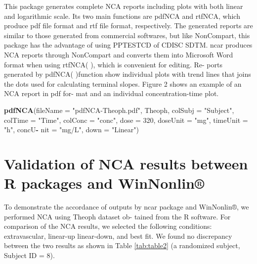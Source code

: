 \documentclass[12pt,]{krantz}
\newenvironment{Shaded}{\begin{snugshade}}{\end{snugshade}}
\newcommand{\KeywordTok}[1]{\textcolor[rgb]{0.13,0.29,0.53}{\textbf{#1}}}
\newcommand{\DataTypeTok}[1]{\textcolor[rgb]{0.13,0.29,0.53}{#1}}
\newcommand{\DecValTok}[1]{\textcolor[rgb]{0.00,0.00,0.81}{#1}}
\newcommand{\StringTok}[1]{\textcolor[rgb]{0.31,0.60,0.02}{#1}}
\newcommand{\OperatorTok}[1]{\textcolor[rgb]{0.81,0.36,0.00}{\textbf{#1}}}
\newcommand{\NormalTok}[1]{#1}
\theoremstyle{definition}
\theoremstyle{definition}
\theoremstyle{definition}
\theoremstyle{remark}
\begin{document}
This package generates complete NCA reports including plots with both
linear and logarithmic scale. Its two main functions are pdfNCA and
rtfNCA, which produce pdf file format and rtf file format, respectively.
The generated reports are similar to those generated from commercial
softwares, but like NonCompart, this package has the advantage of using
PPTESTCD of CDISC SDTM. ncar produces NCA reports through NonCompart and
converts them into Microsoft Word format when using rtfNCA( ), which is
convenient for editing. Re- ports generated by pdfNCA( )function show
individual plots with trend lines that joins the dots used for
calculating terminal slopes. Figure 2 shows an example of an NCA report
in pdf for- mat and an individual concentration-time plot.

\begin{Shaded}
\begin{Highlighting}[]
\KeywordTok{pdfNCA}\NormalTok{(}\DataTypeTok{fileName =} \StringTok{"pdfNCA-Theoph.pdf"}\NormalTok{,}
\NormalTok{Theoph, }\DataTypeTok{colSubj =} \StringTok{"Subject"}\NormalTok{, }\DataTypeTok{colTime =}
\StringTok{"Time"}\NormalTok{, }\DataTypeTok{colConc =} \StringTok{"conc"}\NormalTok{, }\DataTypeTok{dose =} \DecValTok{320}\NormalTok{,}
\DataTypeTok{doseUnit =} \StringTok{"mg"}\NormalTok{, }\DataTypeTok{timeUnit =} \StringTok{"h"}\NormalTok{, concU}\OperatorTok{-}
\DataTypeTok{nit =} \StringTok{"mg/L"}\NormalTok{, }\DataTypeTok{down =} \StringTok{"Linear"}\NormalTok{)}
\end{Highlighting}
\end{Shaded}

\section{Validation of NCA results between R packages and
WinNonlin®}\label{validation-of-nca-results-between-r-packages-and-winnonlin}

To demonstrate the accordance of outputs by ncar package and WinNonlin®,
we performed NCA using Theoph dataset ob- tained from the R software.
For comparison of the NCA results, we selected the following conditions:
extravascular, linear-up linear-down, and best fit. We found no
discrepancy between the two results as shown in Table \ref{tab:table2}
(a randomized subject, Subject ID = 8).
\end{document}
